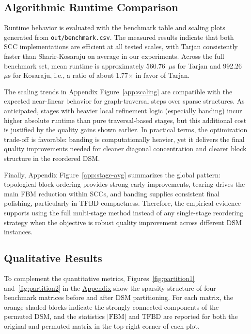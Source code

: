 \documentclass[12pt]{article}
\theoremstyle{definition}
\begin{document}
\subsection{Algorithmic Runtime Comparison}

Runtime behavior is evaluated with the benchmark table and scaling plots generated from \texttt{out/benchmark.csv}. The measured results indicate that both SCC implementations are efficient at all tested scales, with Tarjan consistently faster than Sharir-Kosaraju on average in our experiments. Across the full benchmark set, mean runtime is approximately 560.76~$\mu$s for Tarjan and 992.26~$\mu$s for Kosaraju, i.e., a ratio of about 1.77$\times$ in favor of Tarjan.

The scaling trends in Appendix Figure~\ref{app:scaling} are compatible with the expected near-linear behavior for graph-traversal steps over sparse structures. As anticipated, stages with heavier local refinement logic (especially banding) incur higher absolute runtime than pure traversal-based stages, but this additional cost is justified by the quality gains shown earlier. In practical terms, the optimization trade-off is favorable: banding is computationally heavier, yet it delivers the final quality improvements needed for cleaner diagonal concentration and clearer block structure in the reordered DSM.

Finally, Appendix Figure~\ref{app:stage-avg} summarizes the global pattern: topological block ordering provides strong early improvements, tearing drives the main FBM reduction within SCCs, and banding supplies consistent final polishing, particularly in TFBD compactness. Therefore, the empirical evidence supports using the full multi-stage method instead of any single-stage reordering strategy when the objective is robust quality improvement across different DSM instances.

\subsection{Qualitative Results}

To complement the quantitative metrics, Figures~\ref{fig:partition1} 
and~\ref{fig:partition2} in the \hyperref[sec:appendix]{Appendix} show the sparsity structure of four benchmark matrices before and after DSM partitioning. For each matrix, the orange shaded blocks indicate the strongly connected components of the permuted DSM, and the statistics $|\text{FBM}|$ and $\text{TFBD}$ are reported for both the original and permuted matrix in the top-right corner of each plot.
\end{document}
